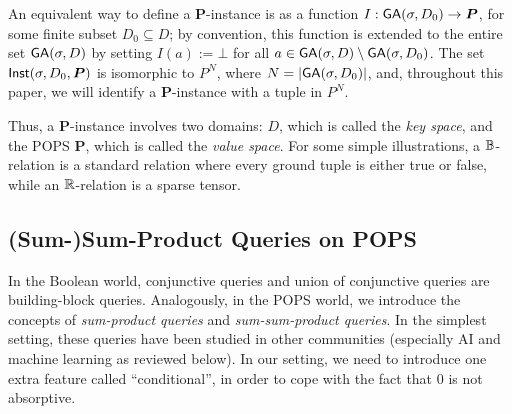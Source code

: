 An equivalent way to define a $\bm P$-instance is as a function
$I : \textsf{GA}(\sigma, D_0) \rightarrow \bm P$, for some finite subset
$D_0 \subseteq D$; by convention, this function is extended to the
entire set $\textsf{GA}(\sigma, D)$ by setting $I(a) := \bot$ for all
$a \in \textsf{GA}(\sigma,D) \setminus \textsf{GA}(\sigma,D_0)$.  The set
$\textsf{Inst}(\sigma, D_0, \bm P)$ is isomorphic to $P^N$, where
$N=|\textsf{GA}(\sigma, D_0)|$, and, throughout this paper, we will
identify a $\bm P$-instance with a tuple in $P^N$.

Thus, a $\bm P$-instance involves two domains: $D$, which is called
the {\em key space}, and the POPS $\bm P$, which is called the {\em
  value space}.  For some simple illustrations, a $\mathbb B$-relation is a
standard relation where every ground tuple is either true or false,
while an $\mathbb R$-relation is a sparse tensor.

\subsection{(Sum-)Sum-Product Queries on POPS}
\label{subsec:sum-products}

In the Boolean world, conjunctive queries and union of conjunctive
queries are building-block queries.  Analogously, in the POPS world,
we introduce the concepts of {\em sum-product queries} and {\em
  sum-sum-product queries}.
In the simplest setting, these queries
have been studied in other communities (especially AI and machine
learning as reviewed below).  In our setting, we need to introduce one
extra feature called ``conditional'', in order to cope with the fact
that $0$ is not absorptive.

% 
% 

